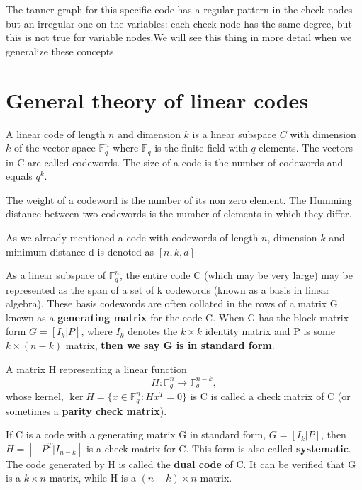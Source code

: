 The tanner graph for this specific code has a regular pattern in the check nodes but an irregular one on the variables: each check node has the same degree, but this is not true for variable nodes.We will see this thing in more detail when we generalize these concepts.

\section{General theory of linear codes}

\begin{definition}
	A linear code of length $n$ and dimension $k$ is a linear subspace $C$ with dimension $k$ of the vector space $\mathbb {F}_{q}^{n}$ where $\mathbb {F}_{q}$ is the finite field with $q$ elements.
	The vectors in C are called codewords. The size of a code is the number of codewords and equals $q^k$.
\end{definition}

\begin{definition}
	The weight of a codeword is the number of its non zero element.
	The Humming distance between two codewords is the number of elements in which they differ.
\end{definition}

As we already mentioned a code with codewords of length $n$, dimension $k$ and minimum distance d is denoted as $[n,k,d]$

\begin{definition}
	As a linear subspace of $\mathbb{F}_{q}^{n}$, the entire code C (which may be very large) may be represented as the span of a set of k codewords (known as a basis in linear algebra). These basis codewords are often collated in the rows of a matrix G known as a \textbf{generating matrix} for the code C. When G has the block matrix form $G=[I_{k}|P]$, where $I_{k}$ denotes the $k\times k$ identity matrix and P is some $k \times (n-k)$ matrix, \textbf{then we say G is in standard form}.

	A matrix H representing a linear function
	\begin{equation}
	H :\mathbb {F}_{q}^{n} \to \mathbb {F}_{q}^{n-k},
	\end{equation}
	whose kernel, $\ker H = \{x \in \mathbb{F}^n_q: H x^T = 0\}$  is C is called a check matrix of C (or sometimes a \textbf{parity check matrix}).

	If C is a code with a generating matrix G in standard form, $G=[I_{k}|P]$, then $H=[-P^{T}|I_{n-k}]$ is a check matrix for C. This form is also called \textbf{systematic}. The code generated by H is called the \textbf{dual code} of C. It can be verified that G is a $k\times n$ matrix, while H is a $(n-k)\times n$ matrix.
\end{definition}

